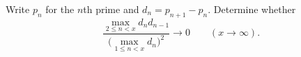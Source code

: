 Write $p_n$ for the $n$th prime and $d_n=p_{n+1}-p_n$. Determine whether
\[
\frac{\max_{2\leq n<x}d_nd_{n-1}}{\bigl(\max_{1\leq n<x}d_n\bigr)^2}\longrightarrow0
\qquad(x\to\infty).
\]
